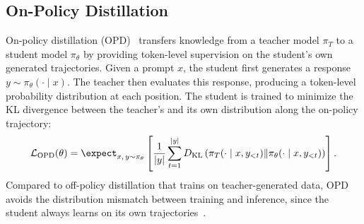 \subsection{On-Policy Distillation}
On-policy distillation (OPD)~\cite{agarwal2024gkd, gu2026minillmonpolicydistillationlarge} transfers knowledge from a teacher model $\pi_T$ to a student model $\pi_\theta$ by providing token-level supervision on the student's own generated trajectories. Given a prompt $x$, the student first generates a response $y \sim \pi_\theta(\cdot \mid x)$. The teacher then evaluates this response, producing a token-level probability distribution at each position. The student is trained to minimize the KL divergence between the teacher's and its own distribution along the on-policy trajectory:
\begin{equation}
\label{eq:opd-1}
    \mathcal{L}_{\text{OPD}}(\theta) = \expect_{x,\, y \sim \pi_\theta} \left[ \frac{1}{|y|} \sum_{t=1}^{|y|} D_{\text{KL}}\left( \pi_T(\cdot \mid x, y_{<t}) \| \pi_\theta(\cdot \mid x, y_{<t}) \right) \right].
\end{equation}
Compared to off-policy distillation that trains on teacher-generated data, OPD avoids the distribution mismatch between training and inference, since the student always learns on its own trajectories~\cite{lu2025onpolicy-opd}.